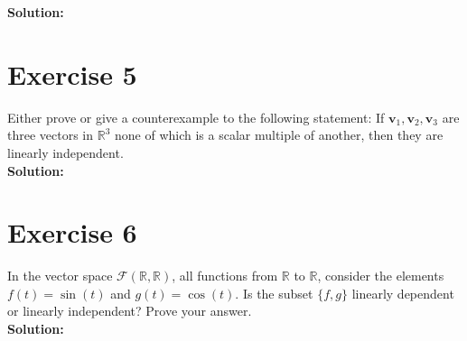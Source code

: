 \documentclass{article}
\begin{document}
\textbf{Solution:}
\newpage

\section*{Exercise 5}
Either prove or give a counterexample to the following statement: If $\mathbf{v}_1, \mathbf{v}_2, \mathbf{v}_3$ are three vectors in $\mathbb{R}^3$ none of which is a scalar multiple of another, then they are linearly independent. \\

\textbf{Solution:}
\newpage

\section*{Exercise 6}
In the vector space $\mathcal{F}(\mathbb{R},\mathbb{R})$, all functions from $\mathbb{R}$ to $\mathbb{R}$, consider the elements $f(t) = \sin(t)$ and $g(t) = \cos(t)$. Is the subset $\{f,g\}$ linearly dependent or linearly independent? Prove your answer. \\

\textbf{Solution:}
\end{document}

